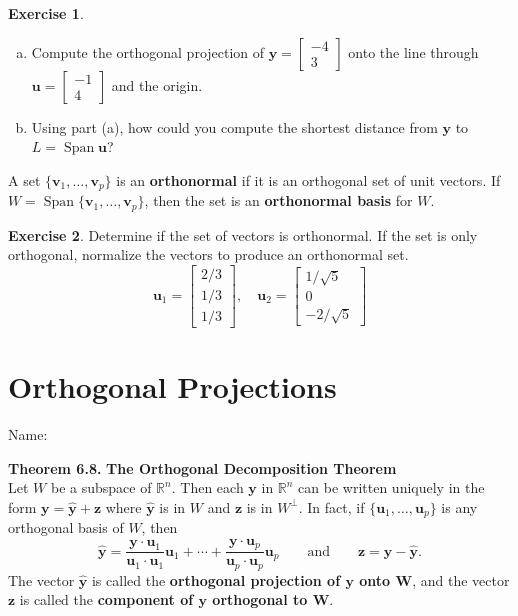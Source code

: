 \documentclass[10pt]{book}
\newcommand{\boxcolor}{gray!30}
\newenvironment{boxthm}{\begin{mdframed}[backgroundcolor=\boxcolor,nobreak=true]}{\end{mdframed}}
\newenvironment{boxdef}{\begin{mdframed}[backgroundcolor=\boxcolor,linewidth=0pt,nobreak=true]}{\end{mdframed}}
\theoremstyle{definition}
\newtheorem{exercise}{Exercise}[section]
\newcommand{\name}[1][2.5in]{\vspace{-2.3em}\hfill Name: \underline{\hspace{#1}}}
\newcommand{\R}{\mathbb{R}}
\newcommand{\vect}[1]{\ensuremath{\boldsymbol{\mathbf{#1}}}}
\DeclareMathOperator{\Span}{Span}
\newcommand{\vectset}[3][v]{\{\vect{#1}_{#2},\ldots,\vect{#1}_{#3}\}}
\newcommand{\vectsetvp}{\{\vect{v}_1,\ldots,\vect{v}_p\}}
\newcommand{\yhat}{\hat{\vect{y}}}
\begin{document}
\begin{exercise} %
	\begin{enumerate}[(a)]
		\item Compute the orthogonal projection of $\vect{y}=\begin{bmatrix}-4\\3\end{bmatrix}$ onto the line through $\vect{u}=\begin{bmatrix}-1\\4\end{bmatrix}$ and the origin.
		\vfill
		
		\item Using part (a), how could you compute the shortest distance from $\vect{y}$ to $L=\Span{\vect{u}}$?
		\vspace{3em}
	\end{enumerate}
\end{exercise}


\begin{boxdef}
	A set $\vectsetvp$ is an \textbf{orthonormal} if it is an orthogonal set of unit vectors. If $W=\Span\vectsetvp$, then the set is an \textbf{orthonormal basis} for $W$.
\end{boxdef}

\begin{exercise} %
	Determine if the set of vectors is orthonormal. If the set is only orthogonal, normalize the vectors to produce an orthonormal set.
	$$ \vect{u}_1 = \begin{bmatrix}2/3\\1/3\\1/3\end{bmatrix}, \quad
	\vect{u}_2 = \begin{bmatrix}1/\sqrt{5}\\0\\-2/\sqrt{5}\end{bmatrix} $$
\end{exercise}
\vfill


\newpage


\section{Orthogonal Projections}
\name

\begin{boxthm}
	\textbf{Theorem 6.8.}
	\textbf{The Orthogonal Decomposition Theorem} \\
	Let $W$ be a subspace of $\R^n$. Then each $\vect{y}$ in $\R^n$ can be written uniquely in the form
	$ \vect{y} = \yhat+\vect{z} $
	where $\yhat$ is in $W$ and $\vect{z}$ is in $W^\perp$. In fact, if $\vectset[u]{1}{p}$ is any orthogonal basis of $W$, then
	$$ \yhat = \frac{\vect{y}\cdot\vect{u}_1}{\vect{u}_1\cdot\vect{u}_1}\vect{u}_1 + \cdots + \frac{\vect{y}\cdot\vect{u}_p}{\vect{u}_p\cdot\vect{u}_p}\vect{u}_p \qquad \text{and} \qquad \vect{z}=\vect{y}-\yhat. $$
	The vector $\yhat$ is called the \textbf{orthogonal projection of $\boldsymbol{\vect{y}}$ onto $\boldsymbol{W}$}, and the vector $\vect{z}$ is called the \textbf{component of $\boldsymbol{\vect{y}}$ orthogonal to $\boldsymbol{W}$}.
\end{boxthm}
\end{document}
